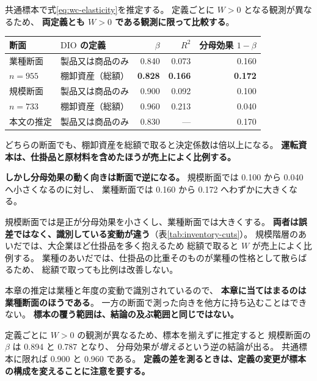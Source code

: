 共通標本で式\eqref{eq:wc-elasticity}を推定する。
定義ごとに $W>0$ となる観測が異なるため、
\textbf{両定義とも $W>0$ である観測に限って比較する}。

\begin{center}
\begin{tabular}{@{}llrrr@{}}
\toprule
断面 & $\mathrm{DIO}$ の定義 & $\beta$ & $R^2$ & 分母効果 $1-\beta$ \\
\midrule
業種断面 & 製品又は商品のみ & 0.840 & 0.073 & 0.160 \\
$n=955$ & 棚卸資産（総額） & \textbf{0.828} & \textbf{0.166} & \textbf{0.172} \\
\midrule
規模断面 & 製品又は商品のみ & 0.900 & 0.092 & 0.100 \\
$n=733$ & 棚卸資産（総額） & 0.960 & 0.213 & 0.040 \\
\midrule
本文の推定 & 製品又は商品のみ & 0.830 & --- & 0.170 \\
\bottomrule
\end{tabular}
\label{tab:inventory-elasticity}
\end{center}

どちらの断面でも、棚卸資産を総額で取ると決定係数は倍以上になる。
\textbf{運転資本は、仕掛品と原材料を含めたほうが売上によく比例する。}

\textbf{しかし分母効果の動く向きは断面で逆になる。}
規模断面では 0.100 から 0.040 へ小さくなるのに対し、
業種断面では 0.160 から 0.172 へわずかに大きくなる。

\begin{remark}[断面が変われば向きが変わる]
\label{rem:inventory-cut}
規模断面では是正が分母効果を小さくし、業種断面では大きくする。
\textbf{両者は誤差ではなく、識別している変動が違う}（表\ref{tab:inventory-cuts}）。
規模階層のあいだでは、大企業ほど仕掛品を多く抱えるため
総額で取ると $W$ が売上によく比例する。
業種のあいだでは、仕掛品の比重そのものが業種の性格として散らばるため、
総額で取っても比例は改善しない。

本章の推定は業種と年度の変動で識別されているので、
\textbf{本章に当てはまるのは業種断面のほうである}。
一方の断面で測った向きを他方に持ち込むことはできない。
\textbf{標本の覆う範囲は、結論の及ぶ範囲と同じではない。}
\end{remark}

\begin{remark}[標本を揃えないと符号が逆に出る]
\label{rem:common-sample}
定義ごとに $W>0$ の観測が異なるため、標本を揃えずに推定すると
規模断面の $\beta$ は 0.894 と 0.787 となり、
分母効果が\emph{増える}という逆の結論が出る。
共通標本に限れば 0.900 と 0.960 である。
\textbf{定義の差を測るときは、定義の変更が標本の構成を変えることに注意を要する。}
\end{remark}


